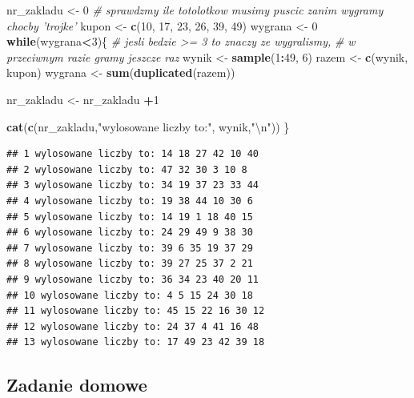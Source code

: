 \documentclass[]{book}
\newenvironment{Shaded}{\begin{snugshade}}{\end{snugshade}}
\newcommand{\KeywordTok}[1]{\textcolor[rgb]{0.13,0.29,0.53}{\textbf{#1}}}
\newcommand{\DecValTok}[1]{\textcolor[rgb]{0.00,0.00,0.81}{#1}}
\newcommand{\CharTok}[1]{\textcolor[rgb]{0.31,0.60,0.02}{#1}}
\newcommand{\StringTok}[1]{\textcolor[rgb]{0.31,0.60,0.02}{#1}}
\newcommand{\CommentTok}[1]{\textcolor[rgb]{0.56,0.35,0.01}{\textit{#1}}}
\newcommand{\ControlFlowTok}[1]{\textcolor[rgb]{0.13,0.29,0.53}{\textbf{#1}}}
\newcommand{\OperatorTok}[1]{\textcolor[rgb]{0.81,0.36,0.00}{\textbf{#1}}}
\newcommand{\NormalTok}[1]{#1}
\theoremstyle{definition}
\theoremstyle{definition}
\theoremstyle{definition}
\theoremstyle{remark}
\begin{document}
\begin{Shaded}
\begin{Highlighting}[]
\NormalTok{nr_zakladu <-}\StringTok{ }\DecValTok{0}  \CommentTok{# sprawdzmy ile totolotkow musimy puscic zanim wygramy chocby 'trojke'}
\NormalTok{kupon <-}\StringTok{ }\KeywordTok{c}\NormalTok{(}\DecValTok{10}\NormalTok{, }\DecValTok{17}\NormalTok{, }\DecValTok{23}\NormalTok{, }\DecValTok{26}\NormalTok{, }\DecValTok{39}\NormalTok{, }\DecValTok{49}\NormalTok{)}
\NormalTok{wygrana <-}\StringTok{ }\DecValTok{0}
\ControlFlowTok{while}\NormalTok{(wygrana}\OperatorTok{<}\DecValTok{3}\NormalTok{)\{ }\CommentTok{# jesli bedzie >= 3 to znaczy ze wygralismy, }
                   \CommentTok{# w przeciwnym razie gramy jeszcze raz}
\NormalTok{  wynik <-}\StringTok{ }\KeywordTok{sample}\NormalTok{(}\DecValTok{1}\OperatorTok{:}\DecValTok{49}\NormalTok{, }\DecValTok{6}\NormalTok{)}
\NormalTok{  razem <-}\StringTok{ }\KeywordTok{c}\NormalTok{(wynik, kupon)}
\NormalTok{  wygrana <-}\StringTok{ }\KeywordTok{sum}\NormalTok{(}\KeywordTok{duplicated}\NormalTok{(razem))}
  
\NormalTok{  nr_zakladu <-}\StringTok{ }\NormalTok{nr_zakladu }\OperatorTok{+}\DecValTok{1}
  
  \KeywordTok{cat}\NormalTok{(}\KeywordTok{c}\NormalTok{(nr_zakladu,}\StringTok{"wylosowane liczby to:"}\NormalTok{, wynik,}\StringTok{"}\CharTok{\textbackslash{}n}\StringTok{"}\NormalTok{))}
\NormalTok{\}}
\end{Highlighting}
\end{Shaded}

\begin{verbatim}
## 1 wylosowane liczby to: 14 18 27 42 10 40 
## 2 wylosowane liczby to: 47 32 30 3 10 8 
## 3 wylosowane liczby to: 34 19 37 23 33 44 
## 4 wylosowane liczby to: 19 38 44 10 30 6 
## 5 wylosowane liczby to: 14 19 1 18 40 15 
## 6 wylosowane liczby to: 24 29 49 9 38 30 
## 7 wylosowane liczby to: 39 6 35 19 37 29 
## 8 wylosowane liczby to: 39 27 25 37 2 21 
## 9 wylosowane liczby to: 36 34 23 40 20 11 
## 10 wylosowane liczby to: 4 5 15 24 30 18 
## 11 wylosowane liczby to: 45 15 22 16 30 12 
## 12 wylosowane liczby to: 24 37 4 41 16 48 
## 13 wylosowane liczby to: 17 49 23 42 39 18
\end{verbatim}

\subsection*{Zadanie domowe}\label{zadanie-domowe-3}
\end{document}
